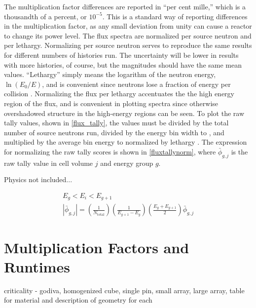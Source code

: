 The multiplication factor differences are reported in ``per cent mille,'' which is a thousandth of a percent, or $10^{-5}$.  This is a standard way of reporting differences in the multiplication factor, as any small deviation from unity can cause a reactor to change its power level.  The flux spectra are normalized per source neutron and per lethargy.  Normalizing per source neutron serves to reproduce the same results for different numbers of histories run.  The uncertainty will be lower in results with more histories, of course, but the magnitudes should have the same mean values.   ``Lethargy'' simply means the logarithm of the neutron energy, $\ln(E_0/E)$, and is convenient since neutrons lose a fraction of energy per collision \cite{duderstadt}.  Normalizing the flux per lethargy accentuates the the high energy region of the flux, and is convenient in plotting spectra since otherwise overshadowed structure in the high-energy regions can be seen.  To plot the raw tally values, shown in \eqref{flux_tally}, the values must be divided by the total number of source neutrons run, divided by the energy bin width to , and multiplied by the average bin energy to normalized by lethargy \cite{lethargyplot}.  The expression for normalizing the raw tally scores is shown in \eqref{fluxtallynorm}, where $\bar{\phi}_{g,j}$ is the raw tally value in cell volume $j$ and energy group $g$.

Physics not included...

\begin{equation}
\label{fluxtallynorm}
\begin{gathered}
E_g < E_i < E_{g+1} \\
|\bar{\phi}_{g,j}| = \left( \frac{1}{N_\mathrm{total}}\right) \left(\frac{1}{E_{g+1}-E_g}\right) \left(\frac{E_g+E_{g+1}}{2} \right) \bar{\phi}_{g,j}
\end{gathered}
\end{equation}

\section{Multiplication Factors and Runtimes}

criticality - godiva, homogenized cube, single pin,  small array, large array, table for material and description of geometry for each

